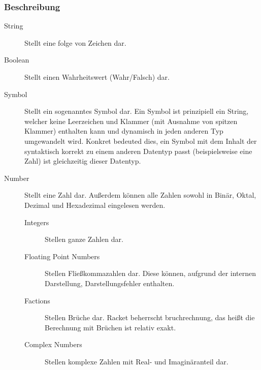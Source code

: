 \subsubsection{Beschreibung}
\begin{description}
	\item[String] Stellt eine folge von Zeichen dar.
	\item[Boolean] Stellt einen Wahrheitswert (Wahr/Falsch) dar.
	\item[Symbol] Stellt ein sogenanntes Symbol dar. Ein Symbol ist prinzipiell ein String, welcher keine Leerzeichen und Klammer (mit Ausnahme von spitzen Klammer) enthalten kann und dynamisch in jeden anderen Typ umgewandelt wird. Konkret bedeuted dies, ein Symbol mit dem Inhalt der syntaktisch korrekt zu einem anderen Datentyp passt (beispielsweise eine Zahl) ist gleichzeitig dieser Datentyp.
	\item[Number] Stellt eine Zahl dar. Außerdem können alle Zahlen sowohl in Binär, Oktal, Dezimal und Hexadezimal eingelesen werden.
		\begin{description}
			\item[Integers] Stellen ganze Zahlen dar.
			\item[Floating Point Numbers] Stellen Fließkommazahlen dar. Diese können, aufgrund der internen Darstellung, Darstellungsfehler enthalten.
			\item[Factions] Stellen Brüche dar. Racket beherrscht bruchrechnung, das heißt die Berechnung mit Brüchen ist relativ exakt.
			\item[Complex Numbers] Stellen komplexe Zahlen mit Real- und Imaginäranteil dar.
		\end{description}
\end{description}


